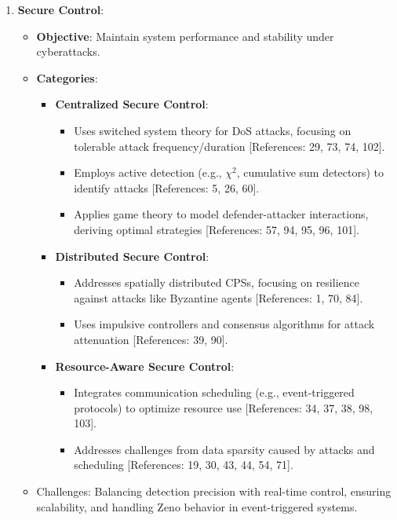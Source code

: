 \documentclass{article}
\begin{document}
\begin{enumerate}[leftmargin=*]
    \item \textbf{Secure Control}:
    \begin{itemize}
        \item \textbf{Objective}: Maintain system performance and stability under cyberattacks.
        \item \textbf{Categories}:
        \begin{itemize}
            \item \textbf{Centralized Secure Control}:
            \begin{itemize}
                \item Uses switched system theory for DoS attacks, focusing on tolerable attack frequency/duration [References: 29, 73, 74, 102].
                \item Employs active detection (e.g., $\chi^2$, cumulative sum detectors) to identify attacks [References: 5, 26, 60].
                \item Applies game theory to model defender-attacker interactions, deriving optimal strategies [References: 57, 94, 95, 96, 101].
            \end{itemize}
            \item \textbf{Distributed Secure Control}:
            \begin{itemize}
                \item Addresses spatially distributed CPSs, focusing on resilience against attacks like Byzantine agents [References: 1, 70, 84].
                \item Uses impulsive controllers and consensus algorithms for attack attenuation [References: 39, 90].
            \end{itemize}
            \item \textbf{Resource-Aware Secure Control}:
            \begin{itemize}
                \item Integrates communication scheduling (e.g., event-triggered protocols) to optimize resource use [References: 34, 37, 38, 98, 103].
                \item Addresses challenges from data sparsity caused by attacks and scheduling [References: 19, 30, 43, 44, 54, 71].
            \end{itemize}
        \end{itemize}
        \item Challenges: Balancing detection precision with real-time control, ensuring scalability, and handling Zeno behavior in event-triggered systems.
    \end{itemize}
    

\end{enumerate}
\end{document}
